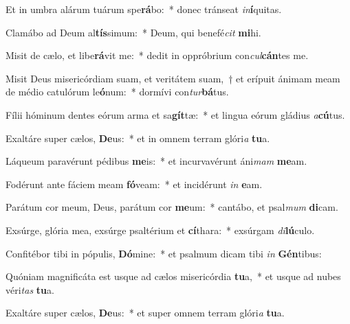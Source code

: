 \item Et in umbra alárum tuárum spe\textbf{rá}bo:~* donec tránseat \textit{in}\textbf{í}quitas.
\item Clamábo ad Deum al\textbf{tís}simum:~* Deum, qui benefé\textit{cit} \textbf{mi}hi.
\item Misit de cælo, et libe\textbf{rá}vit me:~* dedit in oppróbrium con\textit{cul}\textbf{cán}tes me.
\item Misit Deus misericórdiam suam, et veritátem suam,~† et erípuit ánimam meam de médio catulórum le\textbf{ó}num:~* dormívi con\textit{tur}\textbf{bá}tus.
\item Fílii hóminum dentes eórum arma et sa\textbf{gít}tæ:~* et lingua eórum gládius \textit{a}\textbf{cú}tus.
\item Exaltáre super cælos, \textbf{De}us:~* et in omnem terram glóri\textit{a} \textbf{tu}a.
\item Láqueum paravérunt pédibus \textbf{me}is:~* et incurvavérunt áni\textit{mam} \textbf{me}am.
\item Fodérunt ante fáciem meam \textbf{fó}veam:~* et incidérunt \textit{in} \textbf{e}am.
\item Parátum cor meum, Deus, parátum cor \textbf{me}um:~* cantábo, et psal\textit{mum} \textbf{di}cam.
\item Exsúrge, glória mea, exsúrge psaltérium et \textbf{cí}thara:~* exsúrgam \textit{di}\textbf{lú}culo.
\item Confitébor tibi in pópulis, \textbf{Dó}mine:~* et psalmum dicam tibi \textit{in} \textbf{Gén}tibus:
\item Quóniam magnificáta est usque ad cælos misericórdia \textbf{tu}a,~* et usque ad nubes véri\textit{tas} \textbf{tu}a.
\item Exaltáre super cælos, \textbf{De}us:~* et super omnem terram glóri\textit{a} \textbf{tu}a.
